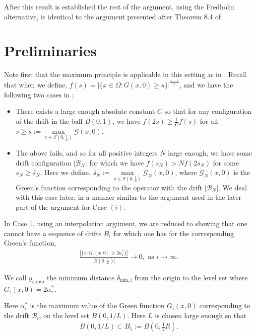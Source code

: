 \documentclass{article}
\theoremstyle{plain}
\theoremstyle{definition}
\theoremstyle{plain}
\newcommand{\B}{\mathcal{B}}
\newcommand{\G}{\mathcal{G}}
\begin{document}
After this result is established the rest of the argument, using the Fredholm alternative, is identical to the argument presented after Theorem 8.4 of \cite{Gt}.
\section{Preliminaries}
 Note first that the maximum principle is applicable in this setting as in \cite{Pat25}. Recall that when we define, $f(s)=|\{x\in \Omega: G(x,0)\geq s\}|^{\frac{n-2}{n}}$, and we have the following two cases in \cite{Pat25}; 
 \begin{itemize}
    \item[(i)] There exists a large enough absolute constant $C$ so that for any configuration of the drift in the ball $B(0,1)$, we have $f(2s)\geq \frac{1}{C}f(s)$ for all $ s\geq \widetilde{s}:=\max\limits_{x\in S(0,\frac{1}{2})}\G(x,0) $.
    \item[(ii)] The above fails, and so for all positive integers $N$ large enough, we have some drift configuration $|\B_N|$ for which we have $f(s_N)>N f(2s_N)$ for some $s_N\geq \widetilde{s_N}$.  Here we define, $\widetilde{s_N}:=\max\limits_{x\in S(0,\frac{1}{2})}\G_N(x,0) $, where $\G_N(x,0)$ is the Green's function corresponding to the operator with the drift $|\B_N|$. We deal with this case later, in a manner similar to the argument used in the later part of the argument for Case $(i)$.
\end{itemize}
\bigskip



In Case 1, using an interpolation argument, we are reduced to showing that one cannot have a sequence of drifts $B_i$ for which one has for the corresponding Green's function,
\begin{align}\frac{|\{x : G_i(x, 0) \ge 2\alpha_i^*\}|}{|B(0, \frac{1}{L})|} \to 0, \text{ as } i \to \infty.\end{align}

We call $y_{i,\text{min}}$ the minimum distance $\delta_{\text{min},i}$ from the origin to the level set where $G_i (x,0)=2\alpha^{*}_i$.

Here $\alpha^{*}_i$ is the maximum value of the Green function $G_i(x,0)$ corresponding to the drift $\B_i$, on the level set $B(0,1/L)$. Here $L$ is chosen large enough so that
\begin{align}\label{eq10}
B(0,1/L)\subset B_1:=B(0,\frac{1}{2}R).
\end{align}
\end{document}

